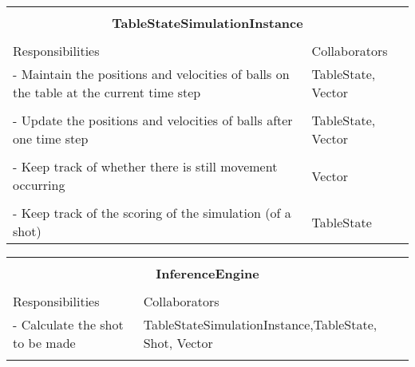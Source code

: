 \documentclass[titlepage]{article}
\begin{document}
\begin{table}[!htbp]
\centering
\begin{tabular}{| p{} | p{} |}\hline
	\multicolumn{2}{|l|}{}\\
	\multicolumn{2}{|c|}{\large{\textbf{TableStateSimulationInstance}}}\\
	\multicolumn{2}{|l|}{}\\\hline
	\vspace{0mm}\large{Responsibilities}\vspace{2mm} &\vspace{0mm}\large{Collaborators}\vspace{2mm}\\\hline
	\vspace{0mm}- Maintain the positions and velocities of balls on the table at the current time step	&\vspace{0mm}TableState, Vector\\&\\
	- Update the positions and velocities of balls after one time step									&TableState, Vector\\&\\
	- Keep track of whether there is still movement occurring											&Vector\\&\\
	- Keep track of the scoring of the simulation (of a shot)\vspace{2mm}								&TableState\vspace{2mm}\\\hline
\end{tabular}
\end{table}

\begin{table}[!htbp]
\centering
\begin{tabular}{| p{} | p{} |}\hline
	\multicolumn{2}{|l|}{}\\
	\multicolumn{2}{|c|}{\large{\textbf{InferenceEngine}}}\\
	\multicolumn{2}{|l|}{}\\\hline
	\vspace{0mm}\large{Responsibilities}\vspace{2mm} &\vspace{0mm}\large{Collaborators}\vspace{2mm}\\\hline
	\vspace{0mm}- Calculate the shot to be made		&\vspace{0mm} TableStateSimulationInstance,\newline TableState, Shot, Vector\\&\\\hline
\end{tabular}
\end{table}
\end{document}
